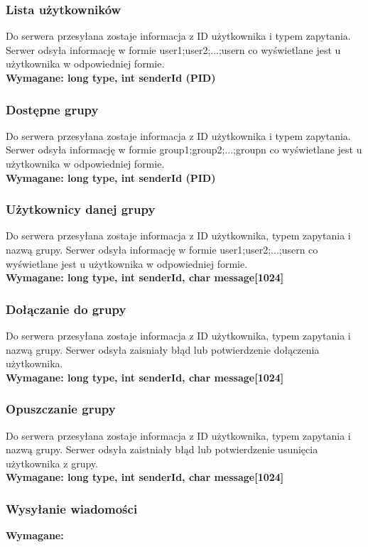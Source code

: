 \documentclass[11pt]{article}
\begin{document}
	\subsubsection{Lista użytkowników}
	Do serwera przesyłana zostaje informacja z ID użytkownika i typem zapytania. Serwer odsyła informację w formie user1;user2;...;usern co wyświetlane jest u użytkownika w odpowiedniej formie.\\
	\textbf{Wymagane: long type, int senderId (PID)}
	\subsubsection{Dostępne grupy}
	Do serwera przesyłana zostaje informacja z ID użytkownika i typem zapytania. Serwer odsyła informację w formie group1;group2;...;groupn co wyświetlane jest u użytkownika w odpowiedniej formie.\\
	\textbf{Wymagane: long type, int senderId (PID)}
	\subsubsection{Użytkownicy danej grupy}
	Do serwera przesyłana zostaje informacja z ID użytkownika, typem zapytania i nazwą grupy. Serwer odsyła informację w formie user1;user2;...;usern co wyświetlane jest u użytkownika w odpowiedniej formie.\\
	\textbf{Wymagane: long type, int senderId, char message[1024]}
	\subsubsection{Dołączanie do grupy}
	Do serwera przesyłana zostaje informacja z ID użytkownika, typem zapytania i nazwą grupy. Serwer odsyła zaisniały błąd lub potwierdzenie dołączenia użytkownika.\\
	\textbf{Wymagane: long type, int senderId, char message[1024]}
	\subsubsection{Opuszczanie grupy}
	Do serwera przesyłana zostaje informacja z ID użytkownika, typem zapytania i nazwą grupy. Serwer odsyła zaistniały błąd lub potwierdzenie usunięcia użytkownika z grupy.\\
	\textbf{Wymagane: long type, int senderId, char message[1024]}
	\subsubsection{Wysyłanie wiadomości}
	\textbf{Wymagane:}
\end{document}

